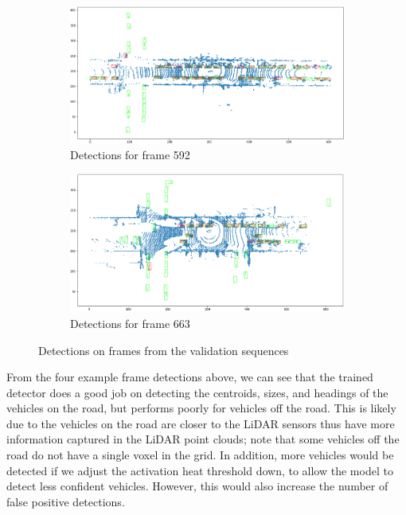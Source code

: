 \documentclass[letter]{article}
\begin{document}
\begin{figure}[h]
		\begin{subfigure}[t]{0.49\textwidth}
			\centering
			\includegraphics[width=\linewidth]{images/det_592.png}
			\caption{Detections for frame 592}
		\end{subfigure}
		\begin{subfigure}[t]{0.49\textwidth}
			\centering
			\includegraphics[width=\linewidth]{images/det_663.png}
			\caption{Detections for frame 663}
		\end{subfigure}

		\caption{Detections on frames from the validation sequences}
	\end{figure}

	From the four example frame detections above, we can see that the trained detector does a good job on detecting the centroids, sizes, and headings of the vehicles on the road, but performs poorly for vehicles off the road. This is likely due to the vehicles on the road are closer to the LiDAR sensors thus have more information captured in the LiDAR point clouds; note that some vehicles off the road do not have a single voxel in the grid. In addition, more vehicles would be detected if we adjust the activation heat threshold down, to allow the model to detect less confident vehicles. However, this would also increase the number of false positive detections. 
\end{document}
